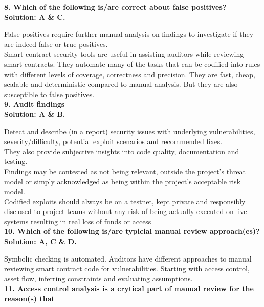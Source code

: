 \textbf{8. Which of the following is/are correct about false positives?}\label{sec:exam6_q8}\\

\textbf{Solution: A \& C.}

False positives require further manual analysis on findings to investigate if they are indeed false or true positives.\\

Smart contract security tools are useful in assisting auditors while reviewing smart contracts.
They automate many of the tasks that can be codified into rules with different levels of coverage, correctness and precision.
They are fast, cheap, scalable and deterministic compared to manual analysis.
But they are also susceptible to false positives.\\

\textbf{9. Audit findings}\label{sec:exam6_q9}\\

\textbf{Solution: A \& B.}

Detect and describe (in a report) security issues with underlying vulnerabilities, severity/difficulty, potential exploit scenarios and recommended fixes.\\

They also provide subjective insights into code quality, documentation and testing.\\

Findings may be contested as not being relevant, outside the project's threat model or simply acknowledged as being within the project's acceptable risk model.\\

Codified exploits should always be on a testnet, kept private and responsibly disclosed to project teams without any risk of being actually executed on live systems resulting in real loss of funds or access\\

\textbf{10. Which of the following is/are typicial manual review approach(es)?}\label{sec:exam6_q10}\\

\textbf{Solution: A, C \& D.}

Symbolic checking is automated.
Auditors have different approaches to manual reviewing smart contract code for vulnerabilities.
Starting with access control, asset flow, inferring constraints and evaluating assumptions.\\

\textbf{11. Access control analysis is a crytical part of manual review for the reason(s) that}\label{sec:exam6_q11}\\

